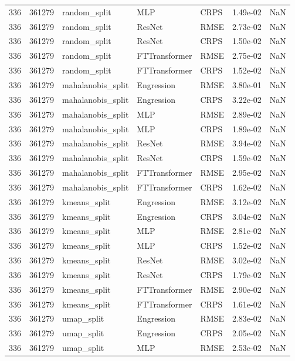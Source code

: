 \begin{tabular}{rrlllrr}
336 & 361279 & random\_split & MLP & CRPS & 1.49e-02 & NaN \\
336 & 361279 & random\_split & ResNet & RMSE & 2.73e-02 & NaN \\
336 & 361279 & random\_split & ResNet & CRPS & 1.50e-02 & NaN \\
336 & 361279 & random\_split & FTTransformer & RMSE & 2.75e-02 & NaN \\
336 & 361279 & random\_split & FTTransformer & CRPS & 1.52e-02 & NaN \\
336 & 361279 & mahalanobis\_split & Engression & RMSE & 3.80e-01 & NaN \\
336 & 361279 & mahalanobis\_split & Engression & CRPS & 3.22e-02 & NaN \\
336 & 361279 & mahalanobis\_split & MLP & RMSE & 2.89e-02 & NaN \\
336 & 361279 & mahalanobis\_split & MLP & CRPS & 1.89e-02 & NaN \\
336 & 361279 & mahalanobis\_split & ResNet & RMSE & 3.94e-02 & NaN \\
336 & 361279 & mahalanobis\_split & ResNet & CRPS & 1.59e-02 & NaN \\
336 & 361279 & mahalanobis\_split & FTTransformer & RMSE & 2.95e-02 & NaN \\
336 & 361279 & mahalanobis\_split & FTTransformer & CRPS & 1.62e-02 & NaN \\
336 & 361279 & kmeans\_split & Engression & RMSE & 3.12e-02 & NaN \\
336 & 361279 & kmeans\_split & Engression & CRPS & 3.04e-02 & NaN \\
336 & 361279 & kmeans\_split & MLP & RMSE & 2.81e-02 & NaN \\
336 & 361279 & kmeans\_split & MLP & CRPS & 1.52e-02 & NaN \\
336 & 361279 & kmeans\_split & ResNet & RMSE & 3.02e-02 & NaN \\
336 & 361279 & kmeans\_split & ResNet & CRPS & 1.79e-02 & NaN \\
336 & 361279 & kmeans\_split & FTTransformer & RMSE & 2.90e-02 & NaN \\
336 & 361279 & kmeans\_split & FTTransformer & CRPS & 1.61e-02 & NaN \\
336 & 361279 & umap\_split & Engression & RMSE & 2.83e-02 & NaN \\
336 & 361279 & umap\_split & Engression & CRPS & 2.05e-02 & NaN \\
336 & 361279 & umap\_split & MLP & RMSE & 2.53e-02 & NaN \\

\end{tabular}
